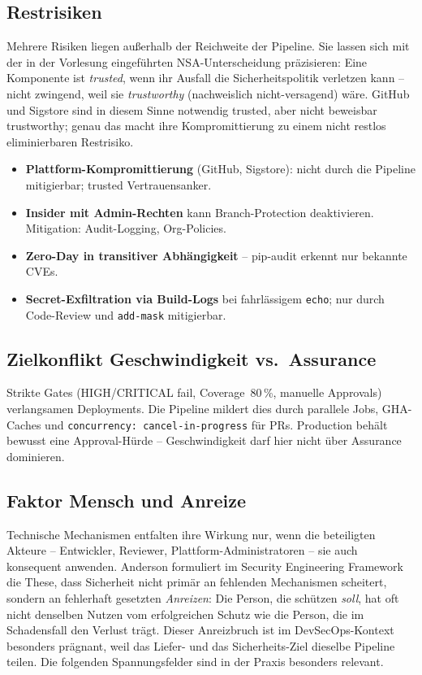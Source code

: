 \documentclass[12pt, a4paper]{scrartcl}
\begin{document}
\subsection{Restrisiken}\label{sec:restrisks}
Mehrere Risiken liegen außerhalb der Reichweite der Pipeline. Sie lassen
sich mit der in der Vorlesung eingeführten NSA-Unterscheidung
präzisieren: Eine Komponente ist \emph{trusted}, wenn ihr Ausfall die
Sicherheitspolitik verletzen kann -- nicht zwingend, weil sie
\emph{trustworthy} (nachweislich nicht-versagend) wäre. GitHub und
Sigstore sind in diesem Sinne notwendig trusted, aber nicht beweisbar
trustworthy; genau das macht ihre Kompromittierung zu einem nicht
restlos eliminierbaren Restrisiko.
\begin{itemize}[leftmargin=1.4em]
  \item \textbf{Plattform-Kompromittierung} (GitHub, Sigstore): nicht durch
        die Pipeline mitigierbar; trusted Vertrauensanker.
  \item \textbf{Insider mit Admin-Rechten} kann Branch-Protection deaktivieren.
        Mitigation: Audit-Logging, Org-Policies.
  \item \textbf{Zero-Day in transitiver Abhängigkeit} -- pip-audit erkennt nur
        bekannte CVEs.
  \item \textbf{Secret-Exfiltration via Build-Logs} bei fahrlässigem
        \texttt{echo}; nur durch Code-Review und \texttt{add-mask} mitigierbar.
\end{itemize}

\subsection{Zielkonflikt Geschwindigkeit vs.\ Assurance}
Strikte Gates (HIGH/CRITICAL fail, Coverage~80\,\%, manuelle Approvals)
verlangsamen Deployments. Die Pipeline mildert dies durch parallele Jobs,
GHA-Caches und \texttt{concurrency: cancel-in-progress} für PRs. Production
behält bewusst eine Approval-Hürde -- Geschwindigkeit darf hier nicht über
Assurance dominieren.

\subsection{Faktor Mensch und Anreize}\label{sec:humanfactor}
Technische Mechanismen entfalten ihre Wirkung nur, wenn die
beteiligten Akteure -- Entwickler, Reviewer, Plattform-Administratoren --
sie auch konsequent anwenden. Anderson formuliert im Security
Engineering Framework die These, dass Sicherheit nicht primär an
fehlenden Mechanismen scheitert, sondern an fehlerhaft gesetzten
\emph{Anreizen}: Die Person, die schützen \emph{soll}, hat oft nicht
denselben Nutzen vom erfolgreichen Schutz wie die Person, die im
Schadensfall den Verlust trägt. Dieser Anreizbruch ist im
DevSecOps-Kontext besonders prägnant, weil das Liefer- und das
Sicherheits-Ziel dieselbe Pipeline teilen. Die folgenden
Spannungsfelder sind in der Praxis besonders relevant.
\end{document}
